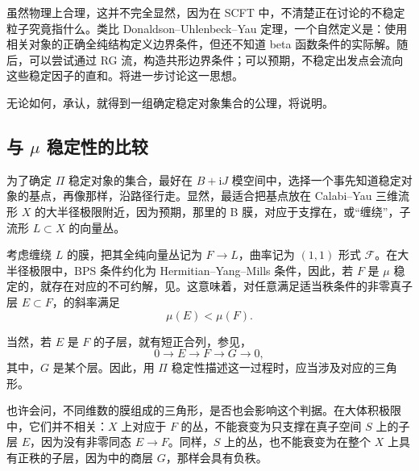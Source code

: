 虽然物理上合理，这并不完全显然，因为在 SCFT 中，不清楚正在讨论的不稳定粒子究竟指什么。类比 Donaldson--Uhlenbeck--Yau 定理，一个自然定义是：使用相关对象的正确全纯结构定义边界条件，但还不知道 beta 函数条件的实际解。随后，可以尝试通过 RG 流，构造共形边界条件；可以预期，不稳定出发点会流向这些稳定因子的直和。将进一步讨论这一思想。

无论如何，承认，就得到一组确定稳定对象集合的公理，将说明。

\subsection{与 \texorpdfstring{$\mu$}{mu} 稳定性的比较}\label{sec:5.5.5}

为了确定 $\Pi$ 稳定对象的集合，最好在 $B+\mathrm{i}J$ 模空间中，选择一个事先知道稳定对象的基点，再像那样，沿路径行走。显然，最适合把基点放在 Calabi--Yau 三维流形 $X$ 的大半径极限附近，因为预期，那里的 B 膜，对应于支撑在，或“缠绕”，子流形 $L\subset X$ 的向量丛。

考虑缠绕 $L$ 的膜，把其全纯向量丛记为 $F\to L$，曲率记为 $(1,1)$ 形式 $\mathcal{F}$。在大半径极限中，BPS 条件约化为 Hermitian--Yang--Mills 条件，因此，若 $F$ 是 $\mu$ 稳定的，就存在对应的不可约解，见。这意味着，对任意满足适当秩条件的非零真子层 $E\subset F$，的斜率满足
\begin{equation}\label{eq:5.138}
\mu(E)<\mu(F).
\end{equation}

当然，若 $E$ 是 $F$ 的子层，就有短正合列，参见，
\begin{equation}\label{eq:5.139}
0\longrightarrow E\longrightarrow F\longrightarrow G\longrightarrow0,
\end{equation}
其中，$G$ 是某个层。因此，用 $\Pi$ 稳定性描述这一过程时，应当涉及对应的三角形。

也许会问，不同维数的膜组成的三角形，是否也会影响这个判据。在大体积极限中，它们并不相关：$X$ 上对应于 $F$ 的丛，不能衰变为只支撑在真子空间 $S$ 上的子层 $E$，因为没有非零同态 $E\to F$。同样，$S$ 上的丛，也不能衰变为在整个 $X$ 上具有正秩的子层，因为中的商层 $G$，那样会具有负秩。

